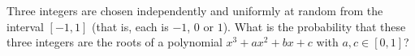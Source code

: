 Three integers are chosen independently and uniformly at random from the interval $[-1,1]$ (that is, each is $-1$, $0$ or $1$). What is the probability that these three integers are the roots of a polynomial $x^3+ax^2+bx+c$ with $a,c\in[0,1]$?
